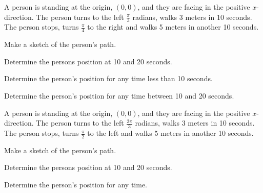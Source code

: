 \begin{problem}
\item A person is standing at the origin, $(0,0)$, and they are facing
  in the positive $x$-direction. The person turns to the left
  $\frac{\pi}{3}$ radians, walks 3 meters in 10 seconds. The person
  stops, turns $\frac{\pi}{4}$ to the right and walks 5 meters in
  another 10 seconds.
  \begin{subproblem}
    \item  Make a sketch of the person's path.
      \vfill
    \item Determine the persons position at 10 and 20 seconds.
      \vfill
    \item Determine the person's position for any time less than 10
      seconds.
      \vfill
    \item Determine the person's position for any time between 10 and
      20 seconds.
      \vfill
  \end{subproblem}
  \clearpage
\item A person is standing at the origin, $(0,0)$, and they are facing
  in the positive $x$-direction. The person turns to the left
  $\frac{2\pi}{3}$ radians, walks 3 meters in 10 seconds. The person
  stops, turns $\frac{\pi}{2}$ to the left and walks 5 meters in
  another 10 seconds.
  \begin{subproblem}
    \item  Make a sketch of the person's path.
      \vfill
    \item Determine the persons position at 10 and 20 seconds.
      \vfill
    \item Determine the person's position for any time.
      \vfill
  \end{subproblem}
\end{problem}

